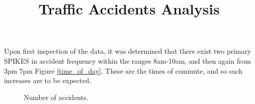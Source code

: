 \documentclass[12pt]{article}
\title{Traffic Accidents Analysis}
\date{}
\begin{document}
\maketitle




Upon first inspection of the data, it was determined that there exist two primary SPIKES in accident frequency within the ranges 8am-10am, and then again from 3pm 7pm Figure \ref{time_of_day}. These are the times of commute, and so such increases are to be expected.

\begin{figure}[h]
\centering     %
{}
\caption{Number of accidents.}
\end{figure}



\end{document}
